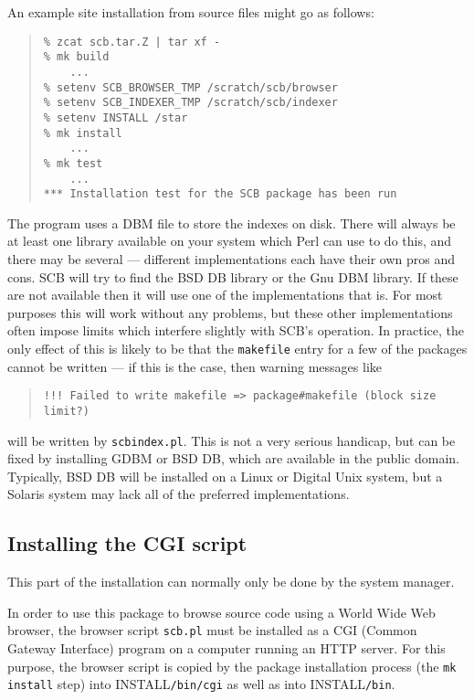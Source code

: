 \documentclass[twoside,11pt]{article}
\newcommand{\xlabel}[1]{}
\renewcommand{\_}{\texttt{\symbol{95}}}
\begin{document}
An example site installation from source files might go as follows:
\begin{quote}
\begin{verbatim}
% zcat scb.tar.Z | tar xf -
% mk build
    ...
% setenv SCB_BROWSER_TMP /scratch/scb/browser
% setenv SCB_INDEXER_TMP /scratch/scb/indexer
% setenv INSTALL /star
% mk install
    ...
% mk test
    ...
*** Installation test for the SCB package has been run
\end{verbatim}
\end{quote}

The program uses a DBM file to store the indexes on disk.
There will always be at least one library available on your system
which Perl can use to do this, and there may be 
several --- different implementations each have their own pros and cons.  
SCB will try to find 
the BSD DB library or the Gnu DBM library.
If these are not available then it will use one of the implementations
that is.  For most purposes this will work without any problems, but
these other implementations often impose limits which interfere slightly
with SCB's operation. 
In practice, the only effect of this is likely to be that the 
{\tt makefile} entry for a few of the packages cannot be written ---
if this is the case, then warning messages like 
\begin{quote}
\begin{verbatim}
!!! Failed to write makefile => package#makefile (block size limit?)
\end{verbatim}
\end{quote}
will be written by {\tt scbindex.pl}.
This is not a very serious handicap, but can be fixed by 
installing GDBM or BSD DB, which are available in the public domain.
Typically, BSD DB will be installed on a Linux or Digital Unix system,
but a Solaris system may lack all of the preferred implementations. 


\subsection{\xlabel{sec:install-cgi}\label{sec:install-cgi}Installing the CGI script}

This part of the installation can normally only be done by 
the system manager.

In order to use this package to browse source code using a
World Wide Web browser, the browser script {\tt scb.pl}
must be installed as a CGI (Common Gateway Interface) program
on a computer running an HTTP server.  
For this purpose, the browser script is copied by the package
installation process (the {\tt mk install} step) 
into INSTALL{\tt /bin/cgi} as well as into INSTALL{\tt /bin}.
\end{document}
